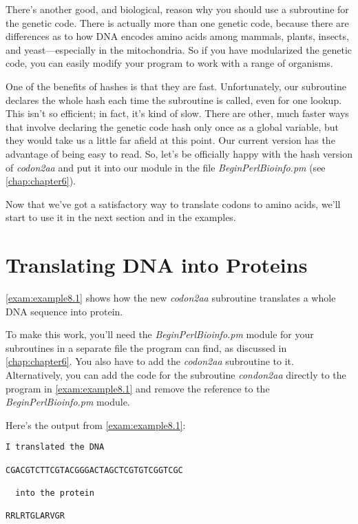 There's another good, and biological, reason why you should use a subroutine for the genetic code. There is actually more than one genetic code, because there are differences as to how DNA encodes amino acids among mammals, plants, insects, and yeast—especially in the mitochondria. So if you have modularized the genetic code, you can easily modify your program to work with a range of organisms.

One of the benefits of hashes is that they are fast. Unfortunately, our subroutine declares the whole hash each time the subroutine is called, even for one lookup. This isn't so efficient; in fact, it's kind of slow. There are other, much faster ways that involve declaring the genetic code hash only once as a global variable, but they would take us a little far afield at this point. Our current version has the advantage of being easy to read. So, let's be officially happy with the hash version of \textit{codon2aa} and put it into our module in the file \textit{BeginPerlBioinfo.pm} (see \autoref{chap:chapter6}).

Now that we've got a satisfactory way to translate codons to amino acids, we'll start to use it in the next section and in the examples. 

\section{Translating DNA into Proteins}
\autoref{exam:example8.1} shows how the new \textit{codon2aa} subroutine translates a whole DNA sequence into protein. 



To make this work, you'll need the \textit{BeginPerlBioinfo.pm} module for your subroutines in a separate file the program can find, as discussed in \autoref{chap:chapter6}. You also have to add the \textit{codon2aa} subroutine to it. Alternatively, you can add the code for the subroutine \textit{condon2aa} directly to the program in \autoref{exam:example8.1} and remove the reference to the \textit{BeginPerlBioinfo.pm} module.

Here's the output from \autoref{exam:example8.1}:

\begin{lstlisting}
I translated the DNA

CGACGTCTTCGTACGGGACTAGCTCGTGTCGGTCGC

  into the protein

RRLRTGLARVGR
\end{lstlisting}

